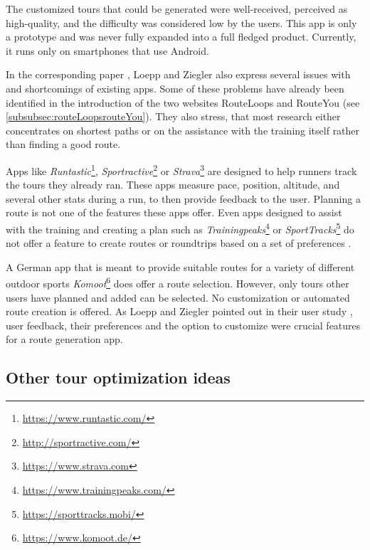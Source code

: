 The customized tours that could be generated were well-received, perceived as high-quality, and the difficulty was considered low by the users.
This app is only a prototype and was never fully expanded into a full fledged product.
Currently, it runs only on smartphones that use Android. 

In the corresponding paper \cite{loepp_recommending_2018}, Loepp and Ziegler also express several issues with and shortcomings of existing apps.
Some of these problems have already been identified in the introduction of the two websites RouteLoops and RouteYou (see \ref{subsubsec:routeLoopsrouteYou}).
They also stress, that most research either concentrates on shortest paths or on the assistance with the training itself rather than finding a good route.

Apps like \textit{Runtastic}\footnote{\url{https://www.runtastic.com/}}, \textit{Sportractive}\footnote{\url{http://sportractive.com/}} or \textit{Strava}\footnote{\url{https://www.strava.com}} are designed to help runners track the tours they already ran. 
These apps measure pace, position, altitude, and several other stats during a run, to then provide feedback to the user. 
Planning a route is not one of the features these apps offer.
Even apps designed to assist with the training and creating a plan such as \textit{Trainingpeaks}\footnote{\url{https://www.trainingpeaks.com/}} or \textit{SportTracks}\footnote{\url{https://sporttracks.mobi/}} do not offer a feature to create routes or roundtrips based on a set of preferences \cite{loepp_recommending_2018}.

A German app that is meant to provide suitable routes for a variety of different outdoor sports \textit{Komoot}\footnote{\url{https://www.komoot.de/}} does offer a route selection. 
However, only tours other users have planned and added can be selected. 
No customization or automated route creation is offered. 
As Loepp and Ziegler pointed out in their user study \cite{loepp_recommending_2018}, user feedback, their preferences and the option to customize were crucial features for a route generation app. 


\subsection{Other tour optimization ideas}
\label{subsec:otherTourOptimization}


